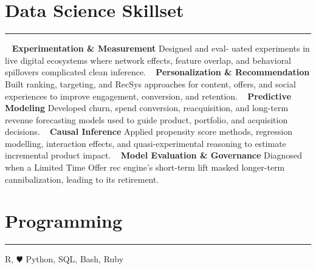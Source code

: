 %
%

\vspace{-1.0cm}
\section{\LARGE Data Science Skillset}
\noindent\rule{\textwidth}{0.4pt}
\vspace{-0.2cm}
~
\textbf{\large Experimentation \& Measurement}
\faGem Designed and eval- uated experiments in live digital ecosystems where network effects, feature overlap, and behavioral spillovers complicated clean inference.
~
\textbf{\large Personalization \& Recommendation}
\faGem Built ranking, targeting, and RecSys approaches for content, offers, and social experiences to improve engagement, conversion, and retention.
~
\textbf{\large Predictive Modeling}
\faGem Developed churn, spend conversion, reacquisition, and long-term revenue forecasting models used to guide product, portfolio, and acquisition decisions.
~
\textbf{\large Causal Inference}
\faGem Applied propensity score methods, regression modelling, interaction effects, and quasi-experimental reasoning to estimate incremental product impact.
~
\textbf{\large Model Evaluation \& Governance}
\faGem Diagnosed when a Limited Time Offer rec engine's short-term lift masked longer-term cannibalization, leading to its retirement.
\section{\LARGE Programming}
\noindent\rule{\textwidth}{0.4pt}
R, {\color{red} $\varheartsuit$} Python, SQL, Bash, Ruby
